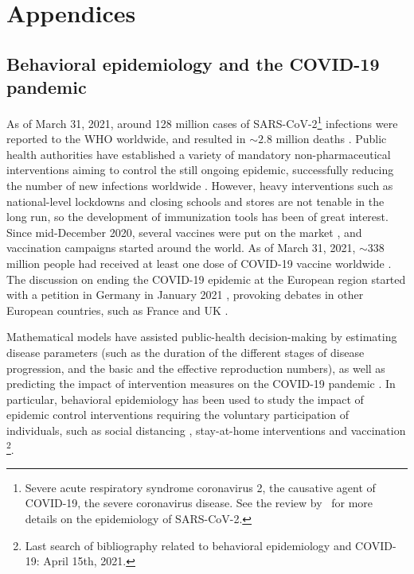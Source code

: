 \let\cleardoublepage\clearpage 
\renewcommand\setthesection{\Alph{section}} 

\chapter*{Appendices}

\section{Behavioral epidemiology and the COVID-19 pandemic}
\label{BehavEpiCOVID}

As of March 31, 2021, around 128 million cases of SARS-CoV-2\footnote{Severe acute respiratory syndrome coronavirus 2, the causative agent of COVID-19, the severe coronavirus disease. See the review by~\cite{Salzberger2020} for more details on the epidemiology of SARS-CoV-2.} infections were reported to the WHO worldwide, and resulted in $\sim2.8$ million deaths \cite[]{WHO_CovidDashboard}. Public health authorities have established a variety of mandatory non-pharmaceutical interventions aiming to control the still ongoing epidemic, successfully reducing the number of new infections worldwide \cite[]{Bo2021}. However, heavy interventions such as national-level lockdowns and closing schools and stores are not tenable in the long run, so the development of immunization tools has been of great interest. Since mid-December 2020, several vaccines were put on the market \cite[]{WHO_CovidVaccines}, and vaccination campaigns started around the world. As of March 31, 2021, $\sim338$ million people had received at least one dose of COVID-19 vaccine worldwide \cite[]{OWID_CovidVaccination}. The discussion on ending the COVID-19 epidemic at the European region started with a petition in Germany in January 2021 \cite[]{ZeroCovid_EU}, provoking debates in other European countries, such as France \cite[]{ZeroCovid_FR} and UK \cite[]{ZeroCovid_UK}. 

Mathematical models have assisted public-health decision-making by estimating disease parameters (such as the duration of the different stages of disease progression, and the basic and the effective reproduction numbers), as well as predicting the impact of intervention measures on the COVID-19 pandemic \cite[]{Xiang2021}. In particular, behavioral epidemiology has been used to study the impact of epidemic control interventions requiring the voluntary participation of individuals, such as social distancing \cite[]{Gupta2020}, stay-at-home interventions \cite[]{Kabir2020} and vaccination \cite[]{Choi2020,Jentsch2021}\footnote{Last search of bibliography related to behavioral epidemiology and COVID-19: April 15th, 2021.}. 

